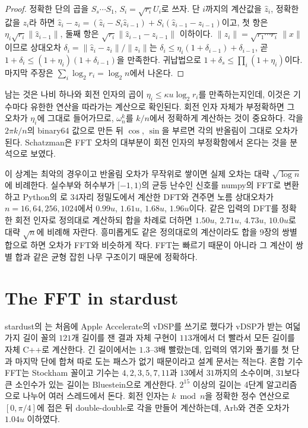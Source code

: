 \begin{proof}
정확한 단의 곱을 $S_s\cdots S_1$, $S_i=\sqrt{r_i}U_i$로 쓰자. 단 $i$까지의 계산값을 $\hat z_i$, 정확한 값을 $z_i$라 하면 $\hat z_i-z_i=(\hat z_i-S_i\hat z_{i-1})+S_i(\hat z_{i-1}-z_{i-1})$이고, 첫 항은 $\eta_i\sqrt{r_i}\|\hat z_{i-1}\|$, 둘째 항은 $\sqrt{r_i}\|\hat z_{i-1}-z_{i-1}\|$ 이하이다. $\|z_i\|=\sqrt{r_1\cdots r_i}\,\|x\|$이므로 상대오차 $\delta_i=\|\hat z_i-z_i\|/\|z_i\|$는 $\delta_i\le\eta_i(1+\delta_{i-1})+\delta_{i-1}$, 곧 $1+\delta_i\le(1+\eta_i)(1+\delta_{i-1})$을 만족한다. 귀납법으로 $1+\delta_s\le\prod_i(1+\eta_i)$이다. 마지막 주장은 $\sum_i\log_2r_i=\log_2n$에서 나온다.
\end{proof}

남는 것은 나비 하나와 회전 인자의 곱이 $\eta_i\le\kappa u\log_2r_i$를 만족하는지인데, 이것은 기수마다 유한한 연산을 따라가는 계산으로 확인된다. 회전 인자 자체가 부정확하면 그 오차가 $\eta_i$에 그대로 들어가므로, $\omega_n^k$를 $k/n$에서 정확하게 계산하는 것이 중요하다. 각을 $2\pi k/n$의 binary64 값으로 만든 뒤 $\cos$, $\sin$을 부르면 각의 반올림이 그대로 오차가 된다. Schatzman은 FFT 오차의 대부분이 회전 인자의 부정확함에서 온다는 것을 분석으로 보였다\cite{schatzman1996}.

이 상계는 최악의 경우이고 반올림 오차가 무작위로 쌓이면 실제 오차는 대략 $\sqrt{\log n}$에 비례한다. 실수부와 허수부가 $[-1,1)$의 균등 난수인 신호를 numpy의 FFT로 변환하고 Python의 로 34자리 정밀도에서 계산한 DFT와 견주면 노름 상대오차가 $n=16,64,256,1024$에서 $0.99u$, $1.61u$, $1.68u$, $1.96u$이다. 같은 입력의 DFT를 정확한 회전 인자로 정의대로 계산하되 합을 차례로 더하면 $1.50u$, $2.71u$, $4.73u$, $10.0u$로 대략 $\sqrt n$에 비례해 자란다. 흥미롭게도 같은 정의대로의 계산이라도 합을 9장의 쌍별 합으로 하면 오차가 FFT와 비슷하게 작다. FFT는 빠르기 때문이 아니라 그 계산이 쌍별 합과 같은 균형 잡힌 나무 구조이기 때문에 정확하다.

\section{The FFT in stardust}
\label{sec:fft-stardust}

\begin{instardust}
stardust의 는 처음에 Apple Accelerate의 vDSP를 쓰기로 했다가 vDSP가 받는 여덟 가지 길이 꼴의 $121$개 길이를 잰 결과 자체 구현이 $113$개에서 더 빨라서 모든 길이를 자체 C++로 계산한다. 긴 길이에서는 $1.3$--$3$배 빨랐는데, 입력의 엮기와 풀기를 첫 단과 마지막 단에 합쳐 따로 도는 패스가 없기 때문이라고 설계 문서는 적는다. 혼합 기수 FFT는 Stockham 꼴이고 기수는 $4,2,3,5,7,11$과 $13$에서 $31$까지의 소수이며, $31$보다 큰 소인수가 있는 길이는 Bluestein으로 계산한다. $2^{15}$ 이상의 길이는 4단계 알고리즘으로 나누어 여러 스레드에서 돈다. 회전 인자는 $k\bmod n$을 정확한 정수 연산으로 $[0,\pi/4]$에 접은 뒤 double-double로 각을 만들어 계산하는데, Arb와 견준 오차가 $1.04u$ 이하였다.
\end{instardust}

